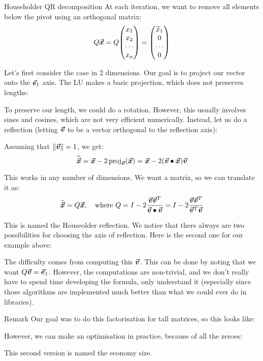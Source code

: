 \documentclass[a4paper]{article}
\begin{document}
\begin{parag}{Householder QR decomposition}
    At each iteration, we want to remove all elements below the pivot using an orthogonal matrix: 
    \[Q \bvec{x} = Q \begin{pmatrix} x_1 \\ x_2 \\ \cdots \\ x_n \end{pmatrix} = \begin{pmatrix} \widetilde{x}_1 \\ 0 \\ \cdots \\ 0 \end{pmatrix} \]
    
    Let's first consider the case in 2 dimensions. Our goal is to project our vector onto the $\bm{\protect\vec{e}}_1$ axis. The LU makes a basic projection, which does not preserves lengths:

    To preserve our length, we could do a rotation. However, this usually involves sines and cosines, which are not very efficient numerically. Instead, let us do a reflection (letting $\bm{\protect\vec{v}}$ to be a vector orthogonal to the reflection axis):

    Assuming that $\left\|\bvec{v}\right\| = 1$, we get:
    \[\widetilde{\bvec{x}} = \bvec{x} - 2\proj_{\bvec{v}}\left(\bvec{x}\right) = \bvec{x} - 2 \left(\bvec{v} \dotprod \bvec{x}\right)\bvec{v}\]

    This works in any number of dimensions. We want a matrix, so we can translate it as: 
    \[\widetilde{\bm{\protect\vec{x}}} = Q \bm{\protect\vec{x}}, \quad \text{where } Q = I - 2 \frac{\bm{\protect\vec{v}} \bm{\protect\vec{v}}^T}{\bm{\protect\vec{v}} \bullet \bm{\protect\vec{v}}} = I - 2 \frac{\bm{\protect\vec{v}} \bm{\protect\vec{v}}^T}{\bm{\protect\vec{v}}^T \bm{\protect\vec{v}}}\]
    
    This is named the Houseolder reflection. We notice that there always are two possibilities for choosing the axis of reflection. Here is the second one for our example above:

    The difficulty comes from computing this $\bm{\protect\vec{v}}$. This can be done by noting that we want $Q \bm{\protect\vec{v}} = \bm{\protect\vec{e}}_1$. However, the computations are non-trivial, and we don't really have to spend time developing the formula, only understand it (especially since those algorithms are implemented much better than what we could ever do in libraries).

    \begin{subparag}{Remark}
        Our goal was to do this factorisation for tall matrices, so this looks like:

        However, we can make an optimisation in practice, because of all the zeroes:

        This second version is named the economy size.
    \end{subparag}
\end{parag}
\end{document}
